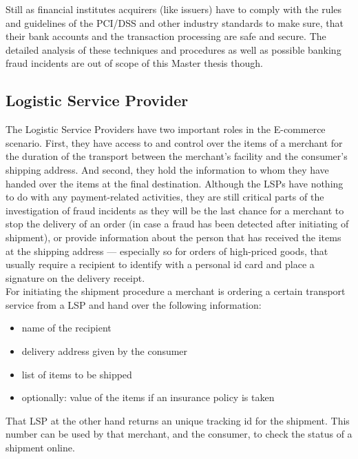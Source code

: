 Still as financial institutes acquirers (like issuers) have to comply with the rules and guidelines of the \gls{PCI/DSS} and other industry standards to make sure, that their bank accounts and the transaction processing are safe and secure. The detailed analysis of these techniques and procedures as well as possible banking fraud incidents are out of scope of this Master thesis though.


\subsection{Logistic Service Provider}
\label{subsec:stakeholder_lsp}

The Logistic Service Providers have two important roles in the \gls{E-commerce} scenario. First, they have access to and control over the items of a merchant for the duration of the transport between the merchant's facility and the consumer's shipping address. And second, they hold the information to whom they have handed over the items at the final destination. Although the \gls{LSP}s have nothing to do with any payment-related activities, they are still critical parts of the investigation of fraud incidents as they will be the last chance for a merchant to stop the delivery of an order (in case a fraud has been detected after initiating of shipment), or provide information about the person that has received the items at the shipping address --- especially so for orders of high-priced goods, that usually require a recipient to identify with a personal id card and place a signature on the delivery receipt. \\

For initiating the shipment procedure a merchant is ordering a certain transport service from a \gls{LSP} and hand over the following information:\@

\begin{itemize}
	\item name of the recipient
	\item delivery address given by the consumer
	\item list of items to be shipped
	\item optionally: value of the items if an insurance policy is taken
\end{itemize}

That \gls{LSP} at the other hand returns an unique tracking id for the shipment. This number can be used by that merchant, and the consumer, to check the status of a shipment online. \\

